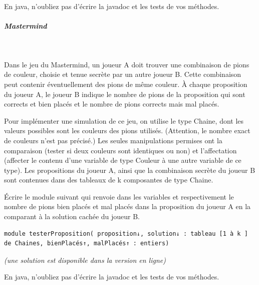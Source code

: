 \documentclass[11pt,a4paper]{article}
\begin{document}
            \par
        En java, n'oubliez pas d'\'ecrire la javadoc et les tests de vos m\'ethodes.
            \par
        
			
		\subparagraph{Mastermind} 
		
					\textcolor{white}{.} \par
				
          Dans le jeu du Mastermind, un joueur A doit trouver une combinaison de 
          \verb@k@ pions de couleur,
          choisie et tenue secr\`ete par un autre joueur B. Cette combinaison peut contenir \'eventuellement 
          des pions de m\^eme couleur. \`A chaque proposition du joueur A, le joueur B indique
          le nombre de pions de la proposition qui sont corrects et bien plac\'es et le nombre de pions
          corrects mais mal plac\'es.
        
            \par
        
          Pour impl\'ementer une simulation de ce jeu, on utilise le type Chaine, dont les valeurs
          possibles sont les couleurs des pions utilis\'es. (Attention, le nombre exact de couleurs n'est
          pas pr\'ecis\'e.) Les seules manipulations permises ont la comparaison (tester si
          deux couleurs sont identiques ou non) et l'affectation (affecter le contenu d'une variable de
          type Couleur \`a une autre variable de ce type). Les propositions du joueur A, ainsi que la
          combinaison secr\`ete du joueur B sont contenues dans des tableaux de k composantes de type
          Chaine.
        
            \par
        
          \'Ecrire le module suivant qui renvoie dans les variables  
          et  respectivement
          le nombre de pions bien plac\'es et mal plac\'es dans la \guillemotleft  proposition \guillemotright  du joueur A en la
          comparant \`a la \guillemotleft  solution \guillemotright  cach\'ee du joueur B.
        
            \par
        \begin{verbatim}
module testerProposition( proposition↓, solution↓ : tableau [1 à k ] de Chaines, bienPlacés↑, malPlacés↑ : entiers)
        \end{verbatim} {\footnotesize\emph{(une solution est disponible dans la version en ligne)}\par} En java, n'oubliez pas d'\'ecrire la javadoc et les tests de vos m\'ethodes.
            \par
        
				
\end{document}
